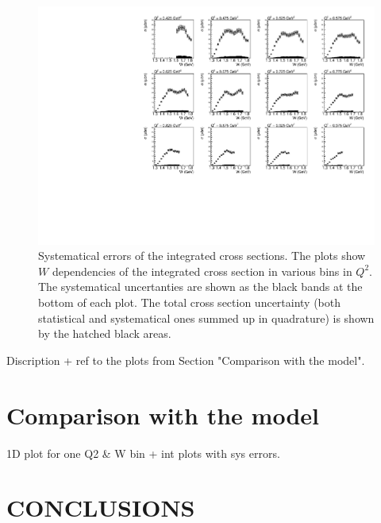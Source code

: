 \documentclass[prc,twocolumn,superscriptaddress,showpacs,amssymb,amsmath,amsfonts,linenumbers,aps]{revtex4-1}
\begin{document}
\begin{figure}[htp]
\begin{center}
\includegraphics[width=15cm]{pictures/sys_err/sys_err.pdf}
\caption{\small Systematical errors of the integrated cross sections. The plots show $W$ dependencies of the integrated cross section in various bins in $Q^{2}$. The systematical uncertanties are shown as the black bands at the bottom of each plot. The total cross section uncertainty (both statistical and systematical ones summed up in quadrature) is shown by the hatched black areas.}
\label{fig:sys_err}

\end{center}
\end{figure}


Discription + ref to the plots from Section "Comparison with the model".

\section{Comparison with the model}

1D plot for one Q2 \& W bin + int plots with sys errors.

\section{CONCLUSIONS}
\end{document}
